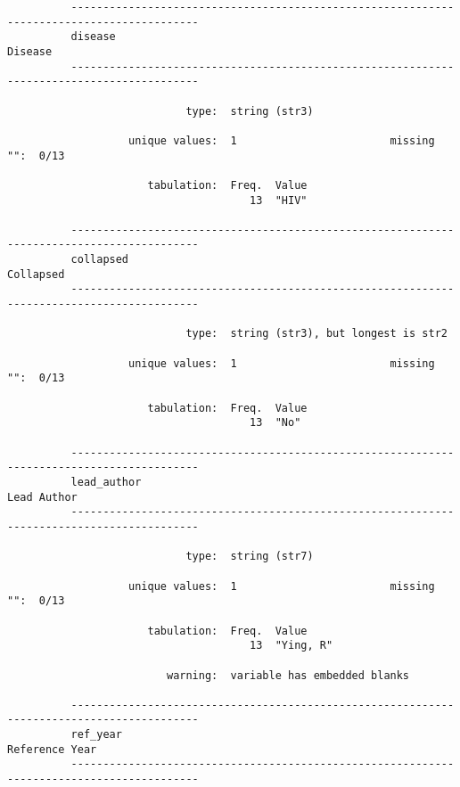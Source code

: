 \documentclass{article}
\begin{document}
\begin{verbatim}
          
          
          
          ------------------------------------------------------------------------------------------
          disease                                                                            Disease
          ------------------------------------------------------------------------------------------
          
                            type:  string (str3)
          
                   unique values:  1                        missing "":  0/13
          
                      tabulation:  Freq.  Value
                                      13  "HIV"
          
          ------------------------------------------------------------------------------------------
          collapsed                                                                        Collapsed
          ------------------------------------------------------------------------------------------
          
                            type:  string (str3), but longest is str2
          
                   unique values:  1                        missing "":  0/13
          
                      tabulation:  Freq.  Value
                                      13  "No"
          
          ------------------------------------------------------------------------------------------
          lead_author                                                                    Lead Author
          ------------------------------------------------------------------------------------------
          
                            type:  string (str7)
          
                   unique values:  1                        missing "":  0/13
          
                      tabulation:  Freq.  Value
                                      13  "Ying, R"
          
                         warning:  variable has embedded blanks
          
          ------------------------------------------------------------------------------------------
          ref_year                                                                    Reference Year
          ------------------------------------------------------------------------------------------
          

\end{verbatim}
\end{document}
